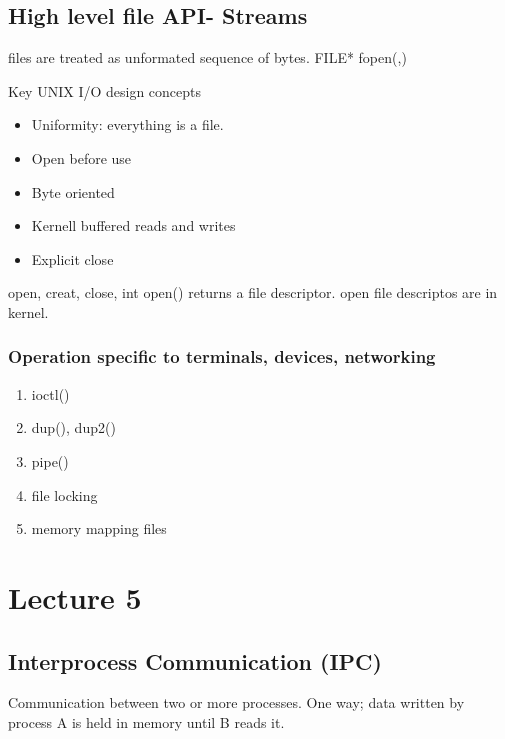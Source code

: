\subsection{High level file API- Streams}
files are treated as unformated sequence of bytes.
FILE* fopen(,)

Key UNIX I/O design concepts 
\begin{itemize}
    \item Uniformity: everything is a file.
    \item Open before use
    \item Byte oriented
    \item Kernell buffered reads and writes
    \item Explicit close
\end{itemize}
open, creat, close,
int open() returns a file descriptor. open file descriptos are in kernel.
\subsubsection{Operation specific to terminals, devices, networking}
\begin{enumerate}
    \item ioctl()
    \item dup(), dup2()
    \item pipe()
    \item file locking
    \item memory mapping files
\end{enumerate}

\section{Lecture 5}
\subsection{Interprocess Communication (IPC)}
Communication between two or more processes. One way; data written by process A is held in memory until B reads it.
